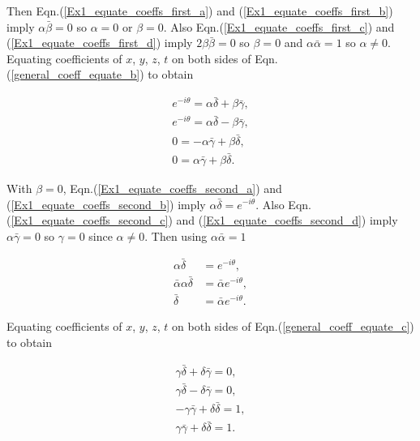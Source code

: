\noindent Then Eqn.(\ref{Ex1_equate_coeffs_first_a}) and (\ref{Ex1_equate_coeffs_first_b}) imply $\alpha \bar{\beta} = 0$ so $\alpha = 0$ or $\beta = 0$. Also Eqn.(\ref{Ex1_equate_coeffs_first_c}) and (\ref{Ex1_equate_coeffs_first_d}) imply $2\beta\bar{\beta} = 0$ so $\beta = 0$ and $\alpha \bar{\alpha} = 1$ so $\alpha \neq 0$. Equating coefficients of $x$, $y$, $z$, $t$ on both sides of Eqn.(\ref{general_coeff_equate_b}) to obtain

\begin{subequations}
\begin{gather}\label{Ex1_equate_coeffs_second_a}
e^{-i\theta} = \alpha \bar{\delta} + \beta\bar{\gamma}, \\\label{Ex1_equate_coeffs_second_b}
e^{-i\theta} = \alpha \bar{\delta} - \beta\bar{\gamma},\\\label{Ex1_equate_coeffs_second_c}
0 = -\alpha\bar{\gamma} + \beta \bar{\delta},\\\label{Ex1_equate_coeffs_second_d}
0 = \alpha\bar{\gamma} + \beta \bar{\delta}. 
\end{gather}
\end{subequations}

\noindent With $\beta = 0$, Eqn.(\ref{Ex1_equate_coeffs_second_a}) and (\ref{Ex1_equate_coeffs_second_b}) imply $\alpha \bar{\delta} = e^{-i\theta}$. Also Eqn.(\ref{Ex1_equate_coeffs_second_c}) and (\ref{Ex1_equate_coeffs_second_d}) imply $\alpha \bar{\gamma} = 0$ so $\gamma = 0$ since $\alpha \neq 0$. Then using $\alpha \bar{\alpha} =1$

\begin{align*}
\alpha \bar{\delta} & = e^{-i\theta}, \\
\bar{\alpha} \alpha \bar{\delta} & = \bar{\alpha} e^{-i\theta},\\
\bar{\delta}  & =  \bar{\alpha} e^{-i\theta}.
\end{align*}

\noindent Equating coefficients of $x$, $y$, $z$, $t$ on both sides of Eqn.(\ref{general_coeff_equate_c}) to obtain

\begin{subequations}
\begin{gather}\label{Ex1_equate_coeffs_third_a}
\gamma \bar{\delta} + \delta \bar{\gamma} = 0, \\\label{Ex1_equate_coeffs_third_b}
\gamma \bar{\delta} - \delta \bar{\gamma} = 0 ,\\\label{Ex1_equate_coeffs_third_c}
-\gamma \bar{\gamma} + \delta \bar{\delta} = 1 ,\\\label{Ex1_equate_coeffs_third_d}
\gamma \bar{\gamma} + \delta \bar{\delta} = 1. 
\end{gather}
\end{subequations}

